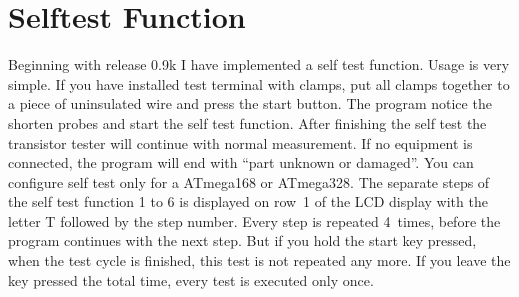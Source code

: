 
\section{Selftest Function}
\label{sec:selftest}
Beginning with release 0.9k I have implemented a self test function. Usage is very simple.
If you have installed  test terminal with clamps, put all clamps together to a piece of uninsulated wire and press the start button.
The program notice the shorten probes and start the self test function.
After finishing the self test the transistor tester will continue with normal measurement.
If no equipment is connected, the program will end with ``part unknown or damaged''. 
You can configure self test only for a ATmega168  or ATmega328.
The separate steps of the self test function 1 to 6 is displayed on row~1 of the LCD display with the letter T
followed by the step number.
Every step is repeated 4~times, before the program continues with the next step.
But if you hold the start key pressed, when the test cycle is finished, this test is not repeated any more.
If you leave the key pressed the total time, every test is executed only once.

